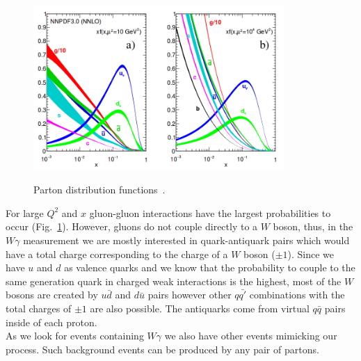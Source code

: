 \begin{figure}[htb]
  \begin{center}
    {\includegraphics[width=0.85\textwidth]{../figs/Intro/pdfs.png}}
    \caption{Parton distribution functions~\cite{ref_PDG}.}
    \label{fig:pdfs}
  \end{center}
\end{figure}

For large $Q^2$ and $x$ gluon-gluon interactions have the largest probabilities to occur (Fig.~\ref{fig:pdfs}). However, gluons do not couple directly to a $W$ boson, thus, in the $W\gamma$ measurement we are mostly interested in quark-antiquark pairs which would have a total charge corresponding to the charge of a $W$ boson ($\pm 1$). Since we have $u$ and $d$ as valence quarks and we know that the probability to couple to the same generation quark in charged weak interactions is the highest, most of the $W$ bosons are created by $u\bar{d}$ and $d\bar{u}$ pairs however other $q\bar{q'}$ combinations with the total charges of $\pm 1$ are also possible. The antiquarks come from virtual $q\bar{q}$ pairs inside of each proton.\\

As we look for events containing $W\gamma$ we also have other events mimicking our process. Such background events can be produced by any pair of partons.\\




